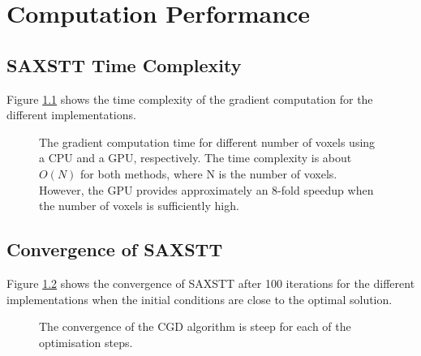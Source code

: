 \chapter{Computation Performance}



\section{SAXSTT Time Complexity}

Figure \ref{fig:gradient_time_complexity} shows the time complexity of the gradient computation for the different implementations.
\begin{figure}[h!]
    \centering
    
    \caption{ The gradient computation time for different number of voxels using a CPU and a GPU, respectively. %
        The time complexity is about $O(N)$ for both methods, where N is the number of voxels. However, the GPU provides approximately an 8-fold speedup when the number of voxels is sufficiently high.}
    \label{fig:gradient_time_complexity}
\end{figure}

\section{Convergence of SAXSTT}

Figure \ref{fig:Loss_curve_optimal} shows the convergence of SAXSTT after 100 iterations for the different implementations when the initial conditions are close to the optimal solution.

\begin{figure}[h!]
    \centering
    \caption{ The convergence of the CGD algorithm is steep for each of the optimisation steps.  }
    \label{fig:Loss_curve_optimal}
\end{figure}

